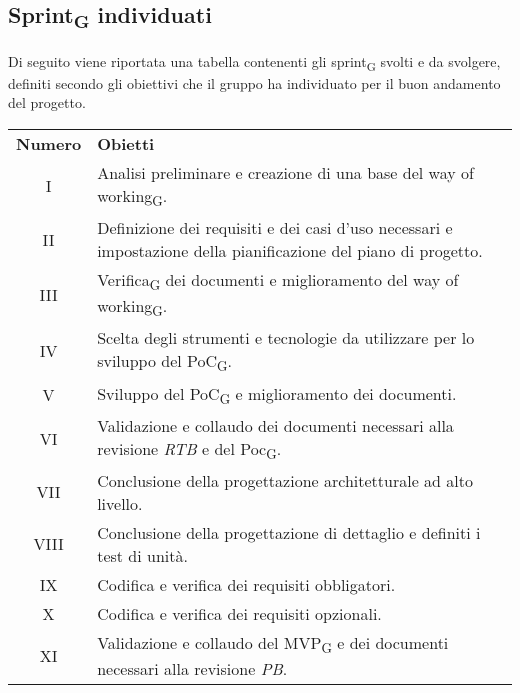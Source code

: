 \subsection{Sprint\textsubscript{G} individuati}
Di seguito viene riportata una tabella contenenti gli sprint\textsubscript{G} svolti e da svolgere, definiti secondo gli obiettivi che il gruppo ha individuato per il buon andamento del progetto.
\begin{center}
	\renewcommand\tabularxcolumn[1]{>{\Centering}m{#1}}
	\setlength\extrarowheight{5pt}
	\begin{tabularx}{\textwidth}{| c | X |} 
		\hline
		\rowcolor{white}
		\textbf{Numero} & \textbf{Obietti}\\
		I &  Analisi preliminare e creazione di una base del way of working\textsubscript{G}. \\
		II & Definizione dei requisiti e dei casi d'uso necessari e impostazione della pianificazione del piano di progetto. \\
		III & Verifica\textsubscript{G} dei documenti e miglioramento del way of working\textsubscript{G}. \\
		IV & Scelta degli strumenti e tecnologie da utilizzare per lo sviluppo del PoC\textsubscript{G}. \\
		V & Sviluppo del PoC\textsubscript{G} e miglioramento dei documenti. \\
		VI & Validazione e collaudo dei documenti necessari alla revisione \textit{RTB} e del Poc\textsubscript{G}.\\
		VII & Conclusione della progettazione architetturale ad alto livello. \\
		VIII & Conclusione della progettazione di dettaglio e definiti i test di unità. \\
		IX & Codifica e verifica dei requisiti obbligatori. \\
		X & Codifica e verifica dei requisiti opzionali. \\
		XI & Validazione e collaudo del MVP\textsubscript{G} e dei documenti necessari alla revisione \textit{PB}.\\
		\hline
	\end{tabularx}
\end{center}